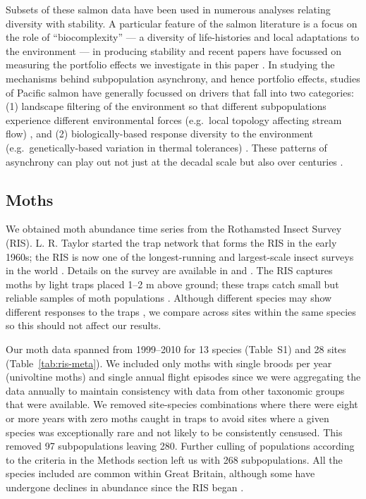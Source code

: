 Subsets of these salmon data have been used in numerous analyses relating
diversity with stability. A particular feature of the salmon literature is a
focus on the role of ``biocomplexity'' --- a diversity of life-histories and
local adaptations to the environment --- in producing stability
\citep{hilborn2003} and recent papers have focussed on measuring the
portfolio effects we investigate in this paper \citep{schindler2010,
  carlson2011}. In studying the mechanisms behind subpopulation
asynchrony, and hence portfolio effects, studies of Pacific salmon have
generally focussed on drivers that fall into two categories: (1) landscape
filtering of the environment so that different subpopulations experience
different environmental forces (e.g.\ local topology affecting stream flow)
\citep[e.g.][]{schindler2008}, and (2) biologically-based response
diversity to the environment (e.g.\ genetically-based variation in thermal
tolerances) \citep[e.g.][]{eliason2011}. These patterns of asynchrony can
play out not just at the decadal scale but also over centuries
\citep{rogers2013}.

\subsection{Moths}
We obtained moth abundance time series from the Rothamsted Insect Survey
(RIS). L. R. Taylor started the trap network that forms the RIS in the early
1960s; the RIS is now one of the longest-running and largest-scale insect
surveys in the world \citep{conrad2004}. Details on the survey are
available in \citet{conrad2004} and \citet{taylor1986}. The RIS
captures moths by light traps \citep{williams1948} placed 1--2 m above
ground; these traps catch small but reliable samples of moth populations
\citep{williams1948, taylor1974, conrad2004}. Although
different species may show different responses to the traps
\citep{muirhead-thomson1991, woiwod1992}, we compare across sites
within the same species so this should not affect our results.

Our moth data spanned from 1999--2010 for 13 species (Table~S1) and 28 sites
(Table~\ref{tab:ris-meta}). We included only moths with single broods per year
(univoltine moths) and single annual flight episodes since we were aggregating
the data annually to maintain consistency with data from other taxonomic
groups that were available. We removed site-species combinations where there
were eight or more years with zero moths caught in traps to avoid sites where
a given species was exceptionally rare and not likely to be consistently
censused. This removed 97 subpopulations leaving 280. Further culling of
populations according to the criteria in the Methods section left us with 268
subpopulations. All the species included are common within Great Britain,
although some have undergone declines in abundance since the RIS began
\citep{conrad2004}.

